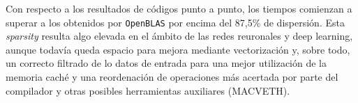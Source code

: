 Con respecto a los resultados de códigos punto a punto, los tiempos comienzan a superar a los obtenidos por \texttt{OpenBLAS} por encima del 87,5\% de dispersión. Esta \textit{sparsity} resulta algo elevada en el ámbito de las redes reuronales y deep learning, aunque todavía queda espacio para mejora mediante vectorización y, sobre todo, un correcto filtrado de lo datos de entrada para una mejor utilización de la memoria caché y una reordenación de operaciones más acertada por parte del compilador y otras posibles herramientas auxiliares (MACVETH).